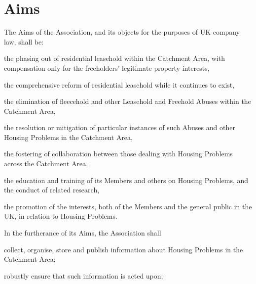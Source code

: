 \documentclass[10pt]{mk-articles-of-association}
\newcommand{\LAFA}[0]{Leasehold and Freehold Abuses}
\begin{document}
\section{Aims}
\begin{constenum}

\item The Aims of the Association, and its objects for the purposes of
  UK company law, shall be:

  \begin{constenum}

  \item the phasing out of residential leasehold within the Catchment
    Area, with compensation only for the freeholders' legitimate
    property interests,

  \item the comprehensive reform of residential leasehold while it
    continues to exist,

  \item the elimination of fleecehold and other \LAFA{} within the
    Catchment Area,

  \item the resolution or mitigation of particular instances of such
    Abuses and other Housing Problems in the Catchment Area,

  \item the fostering of collaboration between those dealing with
    Housing Problems across the Catchment Area,

  \item the education and training of its Members and others on
    Housing Problems, and the conduct of related research, \ITand

  \item the promotion of the interests, both of the Members and the
    general public in the UK, in relation to Housing Problems.

  \end{constenum}

\newpage

\item In the furtherance of its Aims, the Association shall
\begin{constenum}

  \item collect, organise, store and publish information about
    Housing Problems in the Catchment Area;

  \item robustly ensure that such information is acted upon;


\end{constenum}
\end{constenum}
\end{document}
